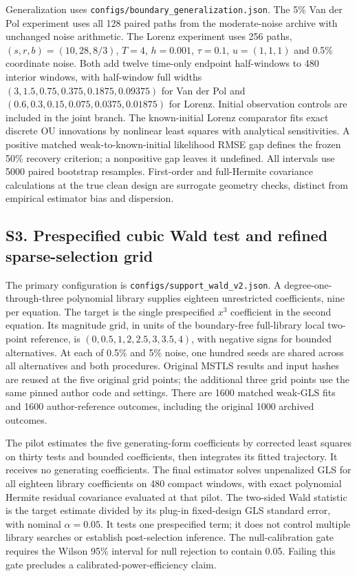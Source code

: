 \documentclass[
  american,
  11pt,
]{article}
\begin{document}
Generalization uses \texttt{configs/boundary\_generalization.json}. The
5\% Van der Pol experiment uses all 128 paired paths from the
moderate-noise archive with unchanged noise arithmetic. The Lorenz
experiment uses 256 paths, \((s,r,b)=(10,28,8/3)\), \(T=4\),
\(h=0.001\), \(\tau=0.1\), \(u=(1,1,1)\) and 0.5\% coordinate noise.
Both add twelve time-only endpoint half-windows to 480 interior windows,
with half-window full widths \((3,1.5,0.75,0.375,0.1875,0.09375)\) for
Van der Pol and \((0.6,0.3,0.15,0.075,0.0375,0.01875)\) for Lorenz.
Initial observation controls are included in the joint branch. The
known-initial Lorenz comparator fits exact discrete OU innovations by
nonlinear least squares with analytical sensitivities. A positive
matched weak-to-known-initial likelihood RMSE gap defines the frozen
50\% recovery criterion; a nonpositive gap leaves it undefined. All
intervals use 5000 paired bootstrap resamples. First-order and
full-Hermite covariance calculations at the true clean design are
surrogate geometry checks, distinct from empirical estimator bias and
dispersion.

\subsection{S3. Prespecified cubic Wald test and refined
sparse-selection
grid}\label{s3.-prespecified-cubic-wald-test-and-refined-sparse-selection-grid}

The primary configuration is \texttt{configs/support\_wald\_v2.json}. A
degree-one-through-three polynomial library supplies eighteen
unrestricted coefficients, nine per equation. The target is the single
prespecified \(x^3\) coefficient in the second equation. Its magnitude
grid, in units of the boundary-free full-library local two-point
reference, is \((0,0.5,1,2,2.5,3,3.5,4)\), with negative signs for
bounded alternatives. At each of 0.5\% and 5\% noise, one hundred seeds
are shared across all alternatives and both procedures. Original MSTLS
results and input hashes are reused at the five original grid points;
the additional three grid points use the same pinned author code and
settings. There are 1600 matched weak-GLS fits and 1600 author-reference
outcomes, including the original 1000 archived outcomes.

The pilot estimates the five generating-form coefficients by corrected
least squares on thirty tests and bounded coefficients, then integrates
its fitted trajectory. It receives no generating coefficients. The final
estimator solves unpenalized GLS for all eighteen library coefficients
on 480 compact windows, with exact polynomial Hermite residual
covariance evaluated at that pilot. The two-sided Wald statistic is the
target estimate divided by its plug-in fixed-design GLS standard error,
with nominal \(\alpha=0.05\). It tests one prespecified term; it does
not control multiple library searches or establish post-selection
inference. The null-calibration gate requires the Wilson 95\% interval
for null rejection to contain 0.05. Failing this gate precludes a
calibrated-power-efficiency claim.
\end{document}
